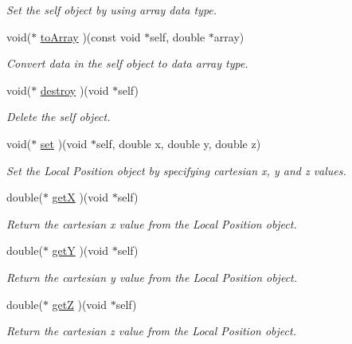 \begin{CompactItemize}
\begin{CompactList}\small\item\em Set the self object by using array data type. \item\end{CompactList}\item 
void($\ast$ \hyperlink{structdrdc__lPosn__t_f5141d0bd5985a7796d54164774817e3}{toArray} )(const void $\ast$self, double $\ast$array)
\begin{CompactList}\small\item\em Convert data in the self object to data array type. \item\end{CompactList}\item 
void($\ast$ \hyperlink{structdrdc__lPosn__t_e04ff92f3ba6ed312499a748c9000ae2}{destroy} )(void $\ast$self)
\begin{CompactList}\small\item\em Delete the self object. \item\end{CompactList}\item 
void($\ast$ \hyperlink{structdrdc__lPosn__t_0c5a736a9c88ab1315d2302b99142136}{set} )(void $\ast$self, double x, double y, double z)
\begin{CompactList}\small\item\em Set the Local Position object by specifying cartesian x, y and z values. \item\end{CompactList}\item 
double($\ast$ \hyperlink{structdrdc__lPosn__t_886c2b143bbca8005b9dca2eaefed1f2}{getX} )(void $\ast$self)
\begin{CompactList}\small\item\em Return the cartesian x value from the Local Position object. \item\end{CompactList}\item 
double($\ast$ \hyperlink{structdrdc__lPosn__t_0cd1f3c953fb21ce05b6a1ed583dd101}{getY} )(void $\ast$self)
\begin{CompactList}\small\item\em Return the cartesian y value from the Local Position object. \item\end{CompactList}\item 
double($\ast$ \hyperlink{structdrdc__lPosn__t_4511ab519ad38c9cffcd682da010d4e1}{getZ} )(void $\ast$self)
\begin{CompactList}\small\item\em Return the cartesian z value from the Local Position object. \item\end{CompactList}\item 

\end{CompactItemize}
